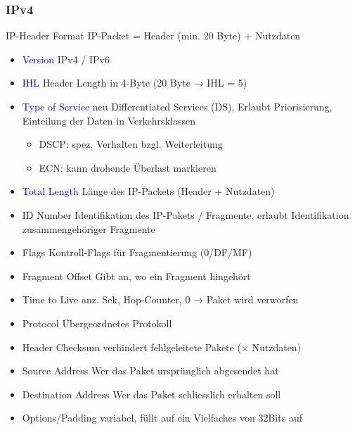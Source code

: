 \subsubsection{IPv4}

\begin{KR}{IP-Header Format}
    {\small IP-Packet = Header (min. 20 Byte) + Nutzdaten}
    \begin{itemize}
        \item \textcolor{blue}{Version} IPv4 / IPv6
        \item \textcolor{blue}{IHL} Header Length in 4-Byte (20 Byte → IHL = 5)
        \item \textcolor{blue}{Type of Service} neu Differentiated Services (DS), Erlaubt Priorisierung, Einteilung der Daten in Verkehrsklassen
        \begin{itemize}
            \item DSCP: spez. Verhalten bzgl. Weiterleitung
            \item ECN: kann drohende Überlast markieren
        \end{itemize}
        \item \textcolor{blue}{Total Length} Länge des IP-Packets (Header + Nutzdaten)
        \item \textcolor{darkcorn}{ID Number} Identifikation des IP-Pakets / Fragmente, erlaubt Identifikation zusammengehöriger Fragmente
        \item \textcolor{darkcorn}{Flags} Kontroll-Flags für Fragmentierung (0/DF/MF)
        \item \textcolor{darkcorn}{Fragment Offset} Gibt an, wo ein Fragment hingehört
        \item \textcolor{darkfrog}{Time to Live} anz. Sek, Hop-Counter, 0 → Paket wird verworfen
        \item \textcolor{darkfrog}{Protocol} Übergeordnetes Protokoll
        \item \textcolor{darkpurple}{Header Checksum} verhindert fehlgeleitete Pakete ($\times $ Nutzdaten)
        \item \textcolor{darkpurple}{Source Address} Wer das Paket ursprünglich abgesendet hat
        \item \textcolor{darkpurple}{Destination Address} Wer das Paket schliesslich erhalten soll
        \item \textcolor{darkpurple}{Options/Padding} variabel, füllt auf ein Vielfaches von 32Bits auf
    \end{itemize}

\end{KR}
